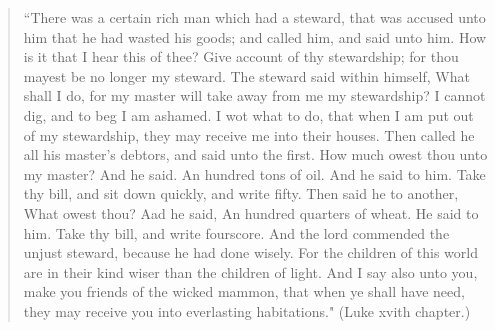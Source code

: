 \documentclass{custom}
\begin{document}
\begin{verse}
``There was a certain rich man which had a steward, that was accused
unto him that he had wasted his goods; and called him, and said unto him. How 
is it that I hear this of thee? Give account of thy stewardship; for thou 
mayest be no longer my steward. The steward said within himself, What shall 
I do, for my master will take away from me my stewardship? I cannot dig, and 
to beg I am ashamed. I wot what to do, that when I am put out of my
stewardship, they may receive me into their houses. Then called he all his master's 
debtors, and said unto the first. How much owest thou unto my master? And 
he said. An hundred tons of oil. And he said to him. Take thy bill, and sit 
down quickly, and write fifty. Then said he to another, What owest thou? 
Aad he said, An hundred quarters of wheat. He said to him. Take thy bill, and 
write fourscore. And the lord commended the unjust steward, because he had 
done wisely. For the children of this world are in their kind wiser than the 
children of light. And I say also unto you, make you friends of the wicked 
mammon, that when ye shall have need, they may receive you into everlasting 
habitations." (Luke xvith chapter.) 
\end{verse}
\end{document}
